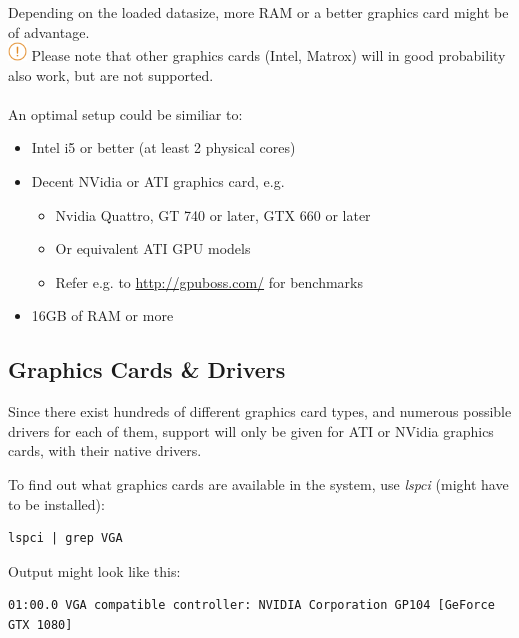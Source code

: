 Depending on the loaded datasize, more RAM or a better graphics card might be of advantage. \\

\includegraphics[width=0.5cm]{../../data/icons/hint.png} Please note that other graphics cards (Intel, Matrox) will in good probability also work, but are not supported. \\\\

An optimal setup could be similiar to:

\begin{itemize}  
\item Intel i5 or better (at least 2 physical cores)
\item Decent NVidia or ATI graphics card, e.g.
\begin{itemize}  
\item Nvidia Quattro, GT 740 or later, GTX 660 or later
\item Or equivalent ATI GPU models
\item Refer e.g. to \url{http://gpuboss.com/} for benchmarks
\end{itemize}
\item 16GB of RAM or more
\end{itemize}


\subsection{Graphics Cards \& Drivers}
\label{sec:graphics_installation}

Since there exist hundreds of different graphics card types, and numerous possible drivers for each of them, support will only be given for ATI or NVidia graphics cards, with their native drivers.

To find out what graphics cards are available in the system, use \textit{lspci} (might have to be installed):

\begin{lstlisting}
lspci | grep VGA
\end{lstlisting}

Output might look like this:

\begin{lstlisting}
01:00.0 VGA compatible controller: NVIDIA Corporation GP104 [GeForce GTX 1080]
\end{lstlisting}

